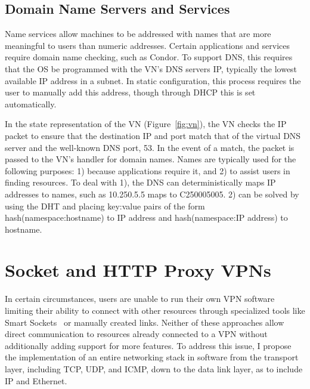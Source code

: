 \subsection{Domain Name Servers and Services}
Name services allow machines to be addressed with names that are more
meaningful to users than numeric addresses.  Certain applications and
services require domain name checking, such as Condor.  To support DNS, this
requires that the OS be programmed with the VN's DNS servers IP, typically
the lowest available IP address in a subnet.  In static configuration, this
process requires the user to manually add this address, though through DHCP
this is set automatically.

In the state representation of the VN (Figure~\ref{fig:vn}), the VN checks the
IP packet to ensure that the destination IP and port match that of the virtual
DNS server and the well-known DNS port, 53.  In the event of a match, the
packet is passed to the VN's handler for domain names.  Names are typically
used for the following purposes: 1) because applications require it, and 2) to
assist users in finding resources.  To deal with 1), the DNS can
deterministically maps IP addresses to names, such as 10.250.5.5 maps to
C250005005.  2) can be solved by using the DHT and placing key:value pairs of
the form hash(namespace:hostname) to IP address and hash(namespace:IP address)
to hostname.

\section{Socket and HTTP Proxy VPNs}
\label{userspace_vpn}
In certain circumstances, users are unable to run their own VPN software
limiting their ability to connect with other resources through specialized tools
like Smart Sockets~\cite{smartsockets} or manually created links.  Neither of
these approaches allow direct communication to resources already connected to
a VPN without additionally adding support for more features.  To address this
issue, I propose the implementation of an entire networking stack in software
from the transport layer, including TCP, UDP, and ICMP, down to the data
link layer, as to include IP and Ethernet.

